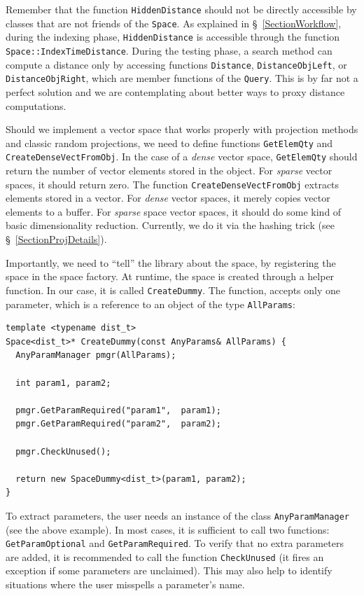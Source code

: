 \documentclass[runningheads,a4paper]{llncs}
\newcommand{\ttt}[1]{\texttt{#1}}
\begin{document}
Remember that the function \ttt{HiddenDistance} should not be directly accessible 
by classes that are not friends of the \ttt{Space}.
As explained in \S~\ref{SectionWorkflow},
during the indexing phase, 
\ttt{HiddenDistance} is accessible through the function
\ttt{Space::IndexTimeDistance}.
During the testing phase, a search method can compute a distance
only by accessing functions \ttt{Distance}, \ttt{DistanceObjLeft}, or
\ttt{DistanceObjRight}, which are member functions of the \ttt{Query}.
This is by far not a perfect solution and we are contemplating about better ways to proxy distance computations. 

Should we implement a vector space that works properly with projection methods
and classic random projections, we need to define functions \ttt{GetElemQty} and \ttt{CreateDenseVectFromObj}. 
In the case of a \emph{dense} vector space, \ttt{GetElemQty}
should return the number of vector elements stored in the object.
For \emph{sparse} vector spaces, it should return zero. The function \ttt{CreateDenseVectFromObj}
extracts elements stored in a vector. For \emph{dense} vector spaces,
it merely copies vector elements to a buffer. 
For \emph{sparse} space vector spaces,
it should do some kind of basic dimensionality reduction. 
Currently, we do it via the hashing trick (see \S~\ref{SectionProjDetails}).


Importantly, we need to ``tell'' the library about the space,
by registering the space in the space factory.
At runtime, the space is created through a helper function.
In our case, it is called \ttt{CreateDummy}.
The function, accepts only one parameter,
which is a reference to an object of the type \ttt{AllParams}:

\begin{verbatim}
template <typename dist_t>
Space<dist_t>* CreateDummy(const AnyParams& AllParams) {
  AnyParamManager pmgr(AllParams);

  int param1, param2;

  pmgr.GetParamRequired("param1",  param1);
  pmgr.GetParamRequired("param2",  param2);

  pmgr.CheckUnused();

  return new SpaceDummy<dist_t>(param1, param2);
}
\end{verbatim}
To extract parameters, the user needs an instance of the class \ttt{AnyParamManager} (see the above example).
In most cases, it is sufficient to call two functions: \ttt{GetParamOptional} and
\ttt{GetParamRequired}.
To verify that no extra parameters are added, it is recommended to call the function \ttt{CheckUnused}
(it fires an exception if some parameters are unclaimed).
This may also help to identify situations where the user misspells 
a parameter's name.
\end{document}

